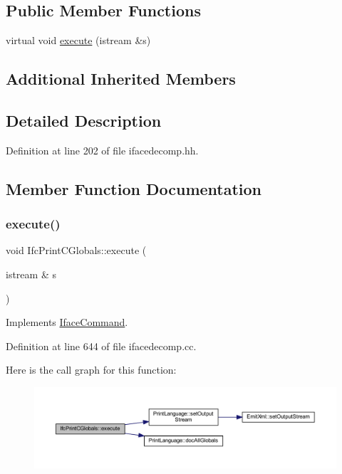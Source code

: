 \subsection*{Public Member Functions}
\begin{DoxyCompactItemize}
\item 
virtual void \mbox{\hyperlink{class_ifc_print_c_globals_a7a490ed00e5ecaf3d805beb7f8ae1ad2}{execute}} (istream \&s)
\end{DoxyCompactItemize}
\subsection*{Additional Inherited Members}


\subsection{Detailed Description}


Definition at line 202 of file ifacedecomp.\+hh.



\subsection{Member Function Documentation}
\mbox{\label{class_ifc_print_c_globals_a7a490ed00e5ecaf3d805beb7f8ae1ad2}} 
\subsubsection{\texorpdfstring{execute()}{execute()}}
{\footnotesize\ttfamily void Ifc\+Print\+C\+Globals\+::execute (\begin{DoxyParamCaption}\item[{istream \&}]{s }\end{DoxyParamCaption})\hspace{0.3cm}{\ttfamily [virtual]}}



Implements \mbox{\hyperlink{class_iface_command_af10e29cee2c8e419de6efe9e680ad201}{Iface\+Command}}.



Definition at line 644 of file ifacedecomp.\+cc.

Here is the call graph for this function\+:
\nopagebreak
\begin{figure}[H]
\begin{center}
\leavevmode
\includegraphics[width=350pt]{class_ifc_print_c_globals_a7a490ed00e5ecaf3d805beb7f8ae1ad2_cgraph}
\end{center}
\end{figure}


